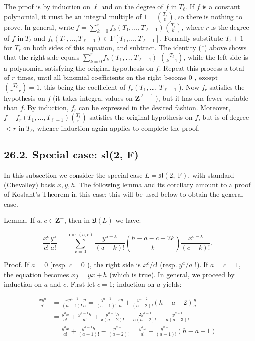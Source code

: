 \documentclass[10pt]{article}
\begin{document}
The proof is by induction on $\ell$ and on the degree of $f$ in $T_{\ell}$. If $f$ is a constant polynomial, it must be an integral multiple of $1=\binom{T_{\ell}}{0}$, so there is nothing to prove. In general, write $f=\sum_{k=0}^{r} f_{k}\left(T_{1}, \ldots, T_{\ell-1}\right)\binom{T_{\ell}}{k}$, where $r$ is the degree of $f$ in $T_{\ell}$ and $f_{k}\left(T_{1}, \ldots, T_{\ell-1}\right) \in \mathrm{F}\left[T_{1}, \ldots, T_{\ell-1}\right]$. Formally substitute $T_{\ell}+1$ for $T_{\ell}$ on both sides of this equation, and subtract. The identity (*) above shows that the right side equals $\sum_{k=0}^{r} f_{k}\left(T_{1}, \ldots, T_{\ell-1}\right)$ $\binom{T_{\ell}}{k-1}$, while the left side is a polynomial satisfying the original hypothesis on $f$. Repeat this process a total of $r$ times, until all binomial coefficients on the right become 0 , except $\binom{T_{\ell}}{r-r}=1$, this being the coefficient of $f_{r}\left(T_{1}, \ldots\right.$, $T_{\ell-1}$ ). Now $f_{r}$ satisfies the hypothesis on $f$ (it takes integral values on $\mathbf{Z}^{\ell-1}$ ), but it has one fewer variable than $f$. By induction, $f_{r}$ can be expressed in the desired fashion. Moreover, $f-f_{r}\left(T_{1}, \ldots, T_{\ell-1}\right)\binom{T_{\ell}}{r}$ satisfies the original hypothesis on $f$, but is of degree $<r$ in $T_{\ell}$, whence induction again applies to complete the proof.

\subsection*{26.2. Special case: sl(2, F)}
In this subsection we consider the special case $L=\mathfrak{s l}(2, \mathrm{~F})$, with standard (Chevalley) basis $x, y, h$. The following lemma and its corollary amount to a proof of Kostant's Theorem in this case; this will be used below to obtain the general case.

Lemma. If $a, c \in \mathbf{Z}^{+}$, then in $\mathfrak{U}(L)$ we have:

$$
\frac{x^{c}}{c!} \frac{y^{a}}{a!}=\sum_{k=0}^{\min (a, c)} \frac{y^{a-k}}{(a-k)!}\binom{h-a-c+2 k}{k} \frac{x^{c-k}}{(c-k)!} .
$$

Proof. If $a=0$ (resp. $c=0$ ), the right side is $x^{c} / c!$ (resp. $y^{a} / a$ !). If $a=c=1$, the equation becomes $x y=y x+h$ (which is true). In general, we proceed by induction on $a$ and $c$. First let $c=1$; induction on $a$ yields:

$$
\begin{aligned}
\frac{x y^{a}}{a!} & =\frac{x y^{a-1}}{(a-1)!} \frac{y}{a}=\frac{y^{a-1}}{(a-1)!} \frac{x y}{a}+\frac{y^{a-2}}{(a-2)!}(h-a+2) \frac{y}{a} \\
& =\frac{y^{a} x}{a!}+\frac{y^{a-1} h}{a!}+\frac{y^{a-1} h}{a(a-2)!}-\frac{2 y^{a-1}}{a(a-2)!}-\frac{y^{a-1}}{a(a-3)!} \\
& =\frac{y^{a} x}{a!}+\frac{y^{a-1} h}{(a-1)!}-\frac{y^{a-1}}{(a-2)!}=\frac{y^{a} x}{a!}+\frac{y^{a-1}}{(a-1)!}(h-a+1)
\end{aligned}
$$
\end{document}
